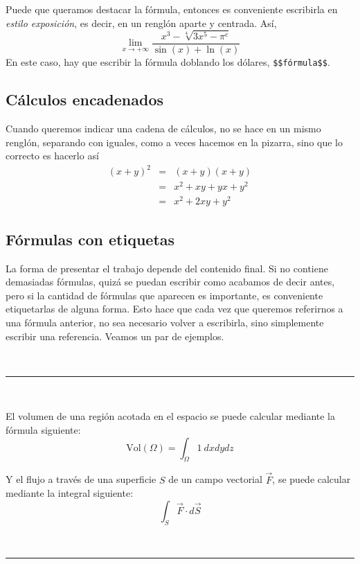 \documentclass[a4paper,12pt]{article}
\begin{document}
{Puede que queramos destacar la fórmula, entonces es conveniente escribirla en \textsl{estilo exposición}, es decir, en un renglón aparte y centrada. Así,
$$\lim_{x\to +\infty}\dfrac{x^3-\sqrt[4]{3x^5-\pi^e}}{\sin(x)+\ln(x)}$$
En este caso, hay que escribir la fórmula doblando los dólares, \verb|$$fórmula$$|. 


\subsection{Cálculos encadenados}

Cuando queremos indicar una cadena de cálculos, no se hace en un mismo renglón, separando con iguales, como a veces hacemos en la pizarra, sino que lo correcto es hacerlo así
$$\begin{array}{lll}
(x+y)^2&=&(x+y)(x+y)\\
&=&x^2+xy+yx+y^2\\
&=&x^2+2xy+y^2
\end{array}
$$

\subsection{Fórmulas con etiquetas}

La forma de presentar el trabajo depende del contenido final. Si no contiene demasiadas fórmulas, quizá se puedan escribir como acabamos de decir antes, pero si la cantidad de fórmulas que aparecen es importante, es conveniente etiquetarlas de alguna forma. Esto hace que cada vez que queremos referirnos a una fórmula anterior, no sea necesario volver a escribirla, sino simplemente escribir una referencia. Veamos un par de ejemplos.

\ 

\hrule

\ 

El volumen de una región acotada en  el espacio se puede calcular mediante la fórmula siguiente:
\begin{equation}
\label{volumen}
\text{Vol}(\Omega)=\int _\Omega 1\ dxdydz
\end{equation}

Y el flujo a través de una superficie $S$ de un campo vectorial $\vec{F}$, se puede calcular mediante la integral siguiente:
\begin{equation}
\label{flujo}
\int_S \vec{F}\cdot d\vec{S}
\end{equation}

\ 

\hrule

}
\end{document}
